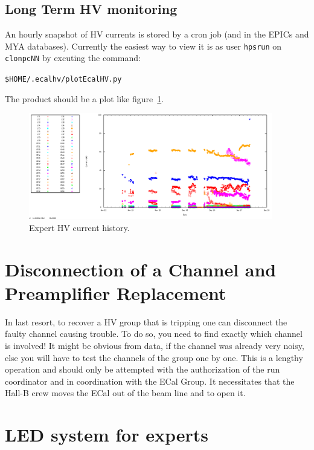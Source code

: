 \documentclass[12pt]{article}
\begin{document}
   \subsection{Long Term HV monitoring}

   An hourly snapshot of HV currents is stored by a cron job (and in the EPICs and MYA databases).  Currently the easiest way to view it is as user \texttt{hpsrun} on \texttt{clonpcNN} by excuting the command:
   \begin{center}
   \texttt{\$HOME/.ecalhv/plotEcalHV.py}
   \end{center}
The product should be a plot like figure~\ref{HVhistory}.

\begin{figure}[htbp]
\center
\includegraphics[width=0.95\textwidth]{pics/ECALHVCURRENTS_2014_12_20.png}
\caption{\small \label{HVhistory} Expert HV current history.}
\end{figure}

   \section{Disconnection of a Channel and Preamplifier Replacement}
     
      In last resort, to recover a HV group that is tripping one can disconnect the faulty channel causing trouble. To do so, you need to find exactly which channel is involved! It might be obvious from data, if the channel was already very noisy, else you will have to test the channels of the group one by one. This is a lengthy operation and should only be attempted with the authorization of the run coordinator and in coordination with the ECal Group. It necessitates that the Hall-B crew moves the ECal out of the beam line and to open it.

   \section{LED system for experts}
\end{document}
